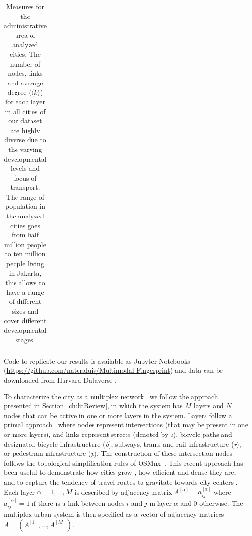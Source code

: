 \begin{table}[ht!]
\begin{adjustbox}{width=\textwidth,keepaspectratio}
\begin{tabular}{l|rrr|rrr|rrr|rrr|r}
		\end{tabular}
	\end{adjustbox}
	\caption[Layers measures for analyzed cities]{Measures for the administrative area of analyzed cities. The number of nodes, links and average degree ($\langle k \rangle$) for each layer in all cities of our dataset are highly diverse due to the varying developmental levels and focus of transport. The range of population in the analyzed cities goes from half million people to ten million people living in Jakarta, this allows to	have a range of different sizes and cover different developmental stages.
		\label{tab:MultiplexCities}}
\end{table}

Code to replicate our results is available as Jupyter Notebooks (\url{https://github.com/nateraluis/Multimodal-Fingerprint}) and data can be downloaded from Harvard Dataverse \cite{natera2019data}.

To characterize the city as a multiplex network~\cite{boccaletti2014structure,kivela2014multilayer,battiston2017new} we follow the approach presented in Section~\ref{ch:litReview}, in which the system has $M$ layers and $N$ nodes that can be active in one or more layers in the system. Layers follow a primal approach~\cite{porta2006primal} where nodes represent intersections (that may be present in one or more layers), and links represent streets (denoted by \textit{s}), bicycle paths and designated bicycle infrastructure (\textit{b}), subways, trams and rail infrastructure (\textit{r}), or pedestrian infrastructure (\textit{p}). The construction of these intersection nodes follows the topological simplification rules of OSMnx~\cite{boeing2017osmnx}. This recent approach has been useful to demonstrate how cities grow \cite{strano2012evolution,Barthelemy2013Evolution}, how efficient \cite{Gallotti2014Efficiency} and dense they are, and to capture the tendency of travel routes to gravitate towards city centers \cite{Lee2017Morphology}. Each layer $\alpha = 1,\dots, M$ is described by adjacency matrix $A^{[\alpha]} = {a^{[\alpha]}_{ij}}$ where $a^{[\alpha]}_{ij} = 1$ if there is a link between nodes $i$ and $j$ in layer $\alpha$ and 0 otherwise. The multiplex urban system is then specified as a vector of adjacency matrices $A = (A^{[1]},\dots,A^{[M]})$.

